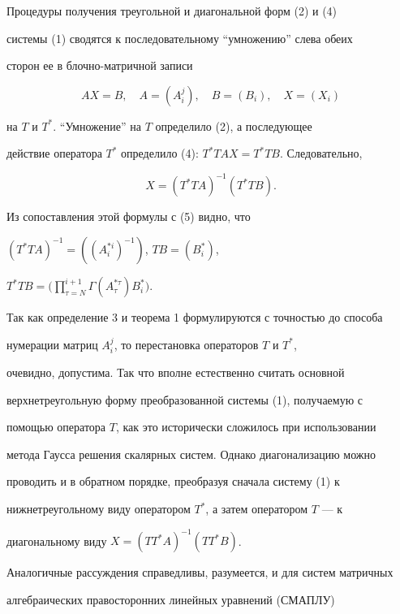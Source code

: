  


Процедуры получения треугольной и диагональной форм (2) и (4)


системы (1) сводятся к последовательному ``умножению'' слева обеих 


сторон ее в блочно-матричной записи 


$$ 


AX=B,\quad A=(A^j_i),\quad B=(B_i),\quad X=(X_i) 


$$ 


на $T$ и $T^*$. ``Умножение'' на $T$ определило (2), а последующее 


действие оператора $T^*$ определило (4): $T^*TAX=T^*TB$. Следовательно, 


$$ 


X=(T^*TA)^{-1}(T^*TB). 


$$ 


Из сопоставления этой формулы с (5) видно, что 


$(T^*TA)^{-1}=((A^{*i}_i)^{-1})$, $TB=(B^*_i)$, 


$T^*TB=\Big(\prod\limits^{i+1}_{\tau=N}\Gamma(A^{*\tau}_\tau) 


B^*_i\Big)$. 


 


Так как определение 3 и теорема 1 формулируются с точностью до способа 


нумерации матриц $A^j_i$, то перестановка операторов $T$ и $T^*$, 


очевидно, допустима. Так что вполне естественно считать основной 


верхнетреугольную форму преобразованной системы (1), получаемую с 


помощью оператора $T$, как это исторически сложилось при использовании 


метода Гаусса решения скалярных систем. Однако диагонализацию можно 


проводить и в обратном порядке, преобразуя сначала систему (1) к 


нижнетреугольному виду оператором $T^*$, а затем оператором $T$ --- к 


диагональному виду $X=(TT^*A)^{-1}(TT^*B)$. 


 


Аналогичные рассуждения справедливы, разумеется, и для систем матричных 


алгебраических правосторонних линейных уравнений (СМАПЛУ) 


